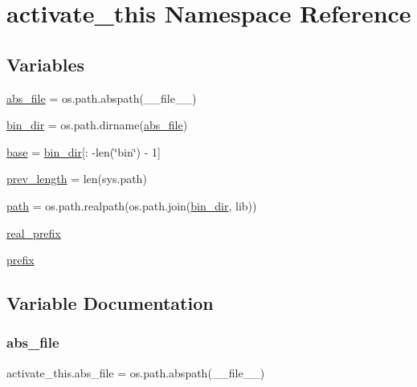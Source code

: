 \hypertarget{namespaceactivate__this}{}\section{activate\+\_\+this Namespace Reference}
\label{namespaceactivate__this}
\subsection*{Variables}
\begin{DoxyCompactItemize}
\item 
\hyperlink{namespaceactivate__this_af88246fa4d35ab2fd5590daaf376c846}{abs\+\_\+file} = os.\+path.\+abspath(\+\_\+\+\_\+file\+\_\+\+\_\+)
\item 
\hyperlink{namespaceactivate__this_ae6aaa357f303f62b37133d8d504402e3}{bin\+\_\+dir} = os.\+path.\+dirname(\hyperlink{namespaceactivate__this_af88246fa4d35ab2fd5590daaf376c846}{abs\+\_\+file})
\item 
\hyperlink{namespaceactivate__this_a16f476f4fd7f92b4594cde74aa08ba0b}{base} = \hyperlink{namespaceactivate__this_ae6aaa357f303f62b37133d8d504402e3}{bin\+\_\+dir}\mbox{[}\+: -\/len(\char`\"{}bin\char`\"{}) -\/ 1\mbox{]}
\item 
\hyperlink{namespaceactivate__this_ac8ccf89b316693e9353039ff50aa53a3}{prev\+\_\+length} = len(sys.\+path)
\item 
\hyperlink{namespaceactivate__this_a740edee9bdad5cf6c5fa9b2ad5548fcc}{path} = os.\+path.\+realpath(os.\+path.\+join(\hyperlink{namespaceactivate__this_ae6aaa357f303f62b37133d8d504402e3}{bin\+\_\+dir}, lib))
\item 
\hyperlink{namespaceactivate__this_a7b4158fab99788240f1a954ba1d51357}{real\+\_\+prefix}
\item 
\hyperlink{namespaceactivate__this_a56db7cfbbd510e1546237fae76397d47}{prefix}
\end{DoxyCompactItemize}


\subsection{Variable Documentation}
\mbox{\label{namespaceactivate__this_af88246fa4d35ab2fd5590daaf376c846}} 
\subsubsection{\texorpdfstring{abs\+\_\+file}{abs\_file}}
{\footnotesize\ttfamily activate\+\_\+this.\+abs\+\_\+file = os.\+path.\+abspath(\+\_\+\+\_\+file\+\_\+\+\_\+)}

